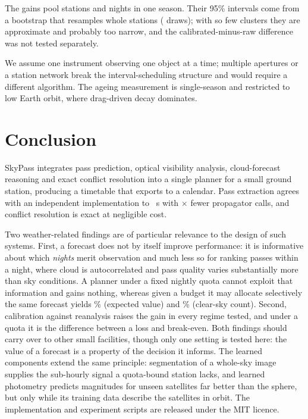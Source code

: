 \documentclass[conference]{IEEEtran}
\begin{document}
The gains pool \EvalStationsWord{} stations and \EvalDays{} nights in one
season. Their 95\% intervals come from a bootstrap that resamples whole stations
(\BootResamples{} draws); with so few clusters they are approximate and probably
too narrow, and the calibrated-minus-raw difference was not tested separately.

We assume one instrument observing one object at a time;
multiple apertures or a station network break the interval-scheduling structure
and would require a different algorithm. The ageing measurement is
single-season and restricted to low Earth orbit, where drag-driven decay
dominates.

\section{Conclusion}

SkyPass integrates pass prediction, optical visibility analysis, cloud-forecast
reasoning and exact conflict resolution into a single planner for a small ground
station, producing a timetable that exports to a calendar. Pass extraction agrees
with an independent implementation to \SkyfieldTca~s with \CallReduction$\times$
fewer propagator calls, and conflict resolution is exact at negligible cost.

Two weather-related findings are of particular relevance to the design of such
systems. First, a forecast does not by itself improve performance: it is
informative about which \emph{nights} merit observation and much less so for
ranking passes within a night, where cloud is autocorrelated and pass quality
varies substantially more than sky conditions. A planner under a fixed nightly
quota cannot exploit that information and gains nothing, whereas given a budget
it may allocate selectively the same forecast yields \BudgetGainEV\% (expected
value) and \BudgetGainClear\% (clear-sky count). Second, calibration against
reanalysis raises the gain in every regime tested, and under a quota it is the
difference between a loss and break-even. Both findings should carry over to
other small facilities, though only one setting is tested here: the value of a
forecast is a property of the decision it informs. The learned components
extend the same principle: segmentation of a whole-sky image supplies the
sub-hourly signal a quota-bound station lacks, and learned photometry predicts
magnitudes for unseen satellites far better than the sphere, but only while its
training data describe the satellites in orbit. The implementation and
experiment scripts are released under the MIT licence.
\end{document}
